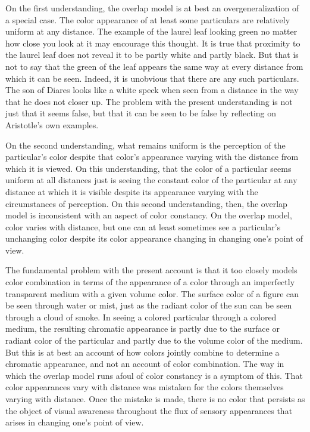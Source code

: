 On the first understanding, the overlap model is at best an overgeneralization of a special case. The color appearance of at least some particulars are relatively uniform at any distance. The example of the laurel leaf looking green no matter how close you look at it may encourage this thought. It is true that proximity to the laurel leaf does not reveal it to be partly white and partly black. But that is not to say that the green of the leaf appears the same way at every distance from which it can be seen. Indeed, it is unobvious that there are any such particulars. The son of Diares looks like a white speck when seen from a distance in the way that he does not closer up. The problem with the present understanding is not just that it seems false, but that it can be seen to be false by reflecting on Aristotle's own examples. 

On the second understanding, what remains uniform is the perception of the particular's color despite that color's appearance varying with the distance from which it is viewed. On this understanding, that the color of a particular seems uniform at all distances just is seeing the constant color of the particular at any distance at which it is visible despite its appearance varying with the circumstances of perception. On this second understanding, then, the overlap model is inconsistent with an aspect of color constancy. On the overlap model, color varies with distance, but one can at least sometimes see a particular's unchanging color despite its color appearance changing in changing one's point of view.

The fundamental problem with the present account is that it too closely models color combination in terms of the appearance of a color through an imperfectly transparent medium with a given volume color. The surface color of a figure can be seen through water or mist, just as the radiant color of the sun can be seen through a cloud of smoke. In seeing a colored particular through a colored medium, the resulting chromatic appearance is partly due to the surface or radiant color of the particular and partly due to the volume color of the medium. But this is at best an account of how colors jointly combine to determine a chromatic appearance, and not an account of color combination. The way in which the overlap model runs afoul of color constancy is a symptom of this. That color appearances vary with distance was mistaken for the colors themselves varying with distance. Once the mistake is made, there is no color that persists as the object of visual awareness throughout the flux of sensory appearances that arises in changing one's point of view. \change

